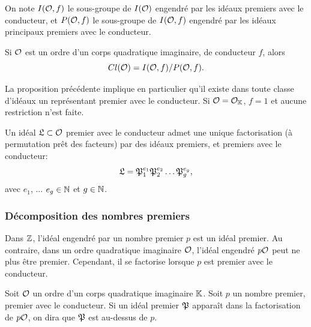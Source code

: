 \begin{Def}
	On note $I(\mathcal{O},f)$ le sous-groupe de $I(\mathcal{O})$ engendré par les idéaux premiers avec le conducteur, et $P(\mathcal{O},f)$ le sous-groupe de $I(\mathcal{O},f)$ engendré par les idéaux principaux premiers avec le conducteur.
\end{Def}

\begin{Prop}
	
	Si $\mathcal{O}$ est un ordre d'un corps quadratique imaginaire, de conducteur $f$, alors
	\begin{equation*}
		Cl(\mathcal{O}) =  I(\mathcal{O}, f)/P(\mathcal{O}, f).
	\end{equation*} 
\end{Prop}

\begin{Rem}
	La proposition précédente implique en particulier qu'il existe dans toute classe d'idéaux un représentant premier avec le conducteur. Si $\mathcal{O} = \mathcal{O}_{\mathbb{K}}$, $f = 1$ et aucune restriction n'est faite. 
\end{Rem}

\begin{Prop}
	Un idéal $\mathfrak{L}\subset\mathcal{O}$ premier avec le conducteur admet une unique factorisation (à permutation prêt des facteurs) par des idéaux premiers, et premiers avec le conducteur:
	\begin{equation*}
		\mathfrak{L} = \mathfrak{P}_{1}^{e_{1}}\mathfrak{P}_{2}^{e_{2}}\ldots\mathfrak{P}_{g}^{e_{g}},
	\end{equation*}
	avec $e_{1}$, ... $e_{g}\in\mathbb{N}$ et $g\in\mathbb{N}$.
	
\end{Prop}




\subsubsection{Décomposition des nombres premiers}


Dans $\mathbb{Z}$, l'idéal engendré par un nombre premier $p$ est un idéal premier. Au contraire, dans un ordre quadratique imaginaire $\mathcal{O}$, l'idéal engendré $p\mathcal{O}$ peut ne plus être premier. Cependant, il se factorise lorsque $p$ est premier avec le conducteur. 


\begin{Def}
	Soit $\mathcal{O}$ un ordre d'un corps quadratique imaginaire $\mathbb{K}$. Soit $p$ un nombre premier, premier avec le conducteur. Si un idéal premier $\mathfrak{P}$ apparaît dans la factorisation de $p\mathcal{O}$, on dira que $\mathfrak{P}$ est au-dessus de $p$. 
\end{Def}

